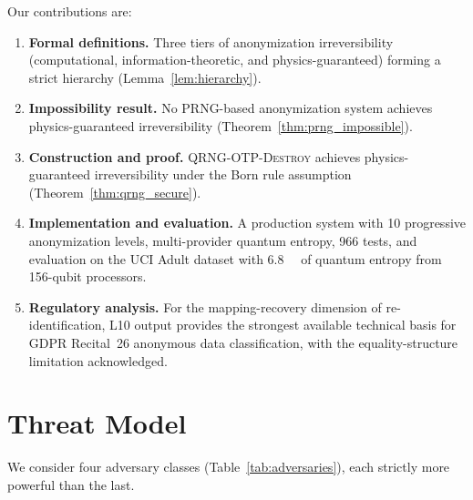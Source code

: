 \documentclass[acmsmall,screen,review,anonymous]{acmart}
\begin{document}
Our contributions are:
\begin{enumerate}
\item \textbf{Formal definitions.} Three tiers of anonymization irreversibility (computational, information-theoretic, and physics-guaranteed) forming a strict hierarchy (Lemma~\ref{lem:hierarchy}).

\item \textbf{Impossibility result.} No PRNG-based anonymization system achieves physics-guaranteed irreversibility (Theorem~\ref{thm:prng_impossible}).

\item \textbf{Construction and proof.} \textsc{QRNG-OTP-Destroy} achieves physics-guaranteed irreversibility under the Born rule assumption (Theorem~\ref{thm:qrng_secure}).

\item \textbf{Implementation and evaluation.} A production system with 10 progressive anonymization levels, multi-provider quantum entropy, 966 tests, and evaluation on the UCI Adult dataset with \SI{6.8}{\mega\byte} of quantum entropy from 156-qubit processors.

\item \textbf{Regulatory analysis.} For the mapping-recovery dimension of re-identification, L10 output provides the strongest available technical basis for GDPR Recital~26 anonymous data classification, with the equality-structure limitation acknowledged.
\end{enumerate}

\section{Threat Model}
\label{sec:threat}

We consider four adversary classes (Table~\ref{tab:adversaries}), each strictly more powerful than the last.
\end{document}
